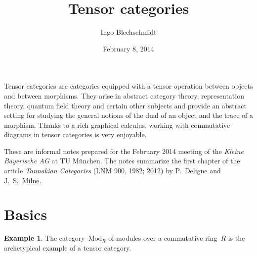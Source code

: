 \documentclass[a4paper,english,12pt]{scrartcl}
\theoremstyle{definition}
\newtheorem{ex}[defn]{Example}
\theoremstyle{plain}
\theoremstyle{remark}
\renewcommand{\_}{\mathpunct{.}\,}
\newcommand{\?}{\,{:}\,}
\newcommand{\Mod}{\mathrm{Mod}}
\begin{document}
\title{Tensor categories}
\author{Ingo Blechschmidt}
\date{February 8, 2014}
\maketitle

\begin{center}\begin{minipage}{0.8\textwidth}
Tensor categories are categories equipped with a tensor operation between
objects and between morphisms. They arise in abstract category theory,
representation theory, quantum field theory and certain other subjects and
provide an abstract setting for studying the general notions of the dual of
an object and the trace of a morphism. Thanks to a rich graphical calculus,
working with commutative diagrams in tensor categories is very
enjoyable.\medskip

These are informal notes prepared for the February 2014 meeting of the \emph{Kleine
Bayerische AG} at TU München. The notes summarize the first chapter of the
article \emph{Tannakian Categories} (LNM 900, 1982;
\href{http://www.jmilne.org/math/xnotes/tc.pdf}{2012}) by P.~Deligne and
J.~S.~Milne.
\end{minipage}\end{center}
\vspace{1em}

\tableofcontents
\newpage

\section{Basics}

\begin{ex}The category~$\Mod_R$ of modules over a commutative ring~$R$ is the
archetypical example of a tensor category.\end{ex}
\end{document}
